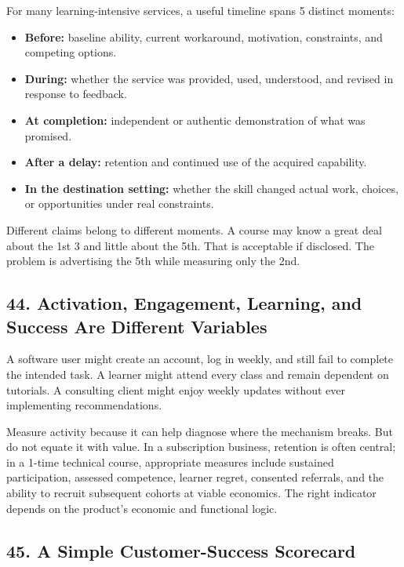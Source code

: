 For many learning-intensive services, a useful timeline spans 5 distinct moments:

\begin{itemize}[leftmargin=1.5em, itemsep=0.4em]
    \item \textbf{Before:} baseline ability, current workaround, motivation, constraints, and competing options.
    \item \textbf{During:} whether the service was provided, used, understood, and revised in response to feedback.
    \item \textbf{At completion:} independent or authentic demonstration of what was promised.
    \item \textbf{After a delay:} retention and continued use of the acquired capability.
    \item \textbf{In the destination setting:} whether the skill changed actual work, choices, or opportunities under real constraints.
\end{itemize}

Different claims belong to different moments. A course may know a great deal about the 1st 3 and little about the 5th. That is acceptable if disclosed. The problem is advertising the 5th while measuring only the 2nd.

\subsection*{44. Activation, Engagement, Learning, and Success Are Different Variables}

A software user might create an account, log in weekly, and still fail to complete the intended task. A learner might attend every class and remain dependent on tutorials. A consulting client might enjoy weekly updates without ever implementing recommendations.

Measure activity because it can help diagnose where the mechanism breaks. But do not equate it with value. In a subscription business, retention is often central; in a 1-time technical course, appropriate measures include sustained participation, assessed competence, learner regret, consented referrals, and the ability to recruit subsequent cohorts at viable economics. The right indicator depends on the product's economic and functional logic.

\subsection*{45. A Simple Customer-Success Scorecard}

